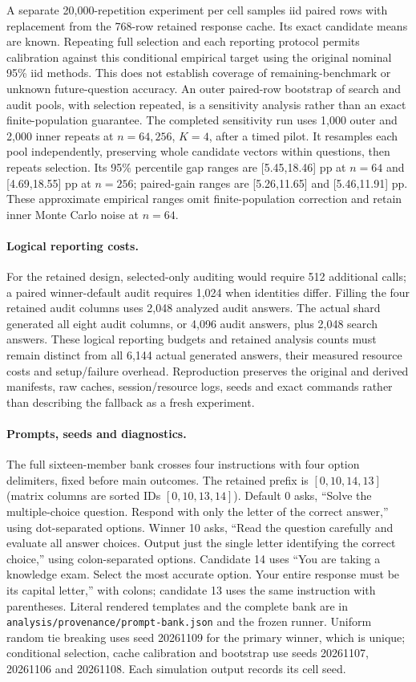 A separate 20,000-repetition experiment per cell samples iid paired rows with replacement from the 768-row retained response cache. Its exact candidate means are known. Repeating full selection and each reporting protocol permits calibration against this conditional empirical target using the original nominal 95\% iid methods. This does not establish coverage of remaining-benchmark or unknown future-question accuracy. An outer paired-row bootstrap of search and audit pools, with selection repeated, is a sensitivity analysis rather than an exact finite-population guarantee. The completed sensitivity run uses 1,000 outer and 2,000 inner repeats at $n=64,256$, $K=4$, after a timed pilot. It resamples each pool independently, preserving whole candidate vectors within questions, then repeats selection. Its 95\% percentile gap ranges are [5.45,18.46] pp at $n=64$ and [4.69,18.55] pp at $n=256$; paired-gain ranges are [5.26,11.65] and [5.46,11.91] pp. These approximate empirical ranges omit finite-population correction and retain inner Monte Carlo noise at $n=64$.

\paragraph{Logical reporting costs.}
For the retained design, selected-only auditing would require 512 additional calls; a paired winner-default audit requires 1,024 when identities differ. Filling the four retained audit columns uses 2,048 analyzed audit answers. The actual shard generated all eight audit columns, or 4,096 audit answers, plus 2,048 search answers. These logical reporting budgets and retained analysis counts must remain distinct from all 6,144 actual generated answers, their measured resource costs and setup/failure overhead. Reproduction preserves the original and derived manifests, raw caches, session/resource logs, seeds and exact commands rather than describing the fallback as a fresh experiment.


\paragraph{Prompts, seeds and diagnostics.}
The full sixteen-member bank crosses four instructions with four option delimiters, fixed before main outcomes. The retained prefix is $[0,10,14,13]$ (matrix columns are sorted IDs $[0,10,13,14]$). Default 0 asks, ``Solve the multiple-choice question. Respond with only the letter of the correct answer,'' using dot-separated options. Winner 10 asks, ``Read the question carefully and evaluate all answer choices. Output just the single letter identifying the correct choice,'' using colon-separated options. Candidate 14 uses ``You are taking a knowledge exam. Select the most accurate option. Your entire response must be its capital letter,'' with colons; candidate 13 uses the same instruction with parentheses. Literal rendered templates and the complete bank are in \texttt{analysis/provenance/prompt-bank.json} and the frozen runner. Uniform random tie breaking uses seed 20261109 for the primary winner, which is unique; conditional selection, cache calibration and bootstrap use seeds 20261107, 20261106 and 20261108. Each simulation output records its cell seed.

